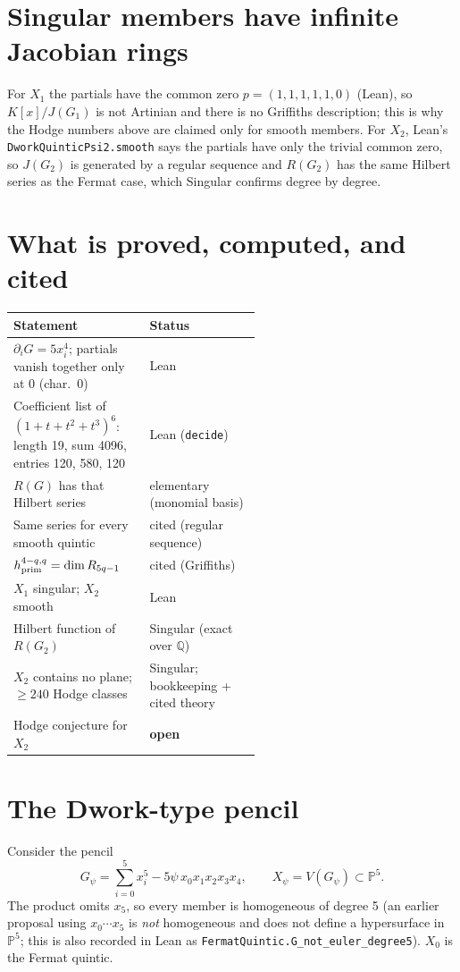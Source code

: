 \documentclass[11pt]{article}
\theoremstyle{definition}\newtheorem{definition}[theorem]{Definition}\newtheorem{remark}[theorem]{Remark}
\newcommand{\PP}{\mathbb{P}}\newcommand{\CC}{\mathbb{C}}\newcommand{\QQ}{\mathbb{Q}}
\begin{document}
\section{Singular members have infinite Jacobian rings}
For $X_1$ the partials have the common zero $p=(1,1,1,1,1,0)$ (Lean), so $K[x]/J(G_1)$ is not Artinian and
there is no Griffiths description; this is why the Hodge numbers above are claimed only for smooth members.
For $X_2$, Lean's \texttt{DworkQuinticPsi2.smooth} says the partials have only the trivial common zero, so
$J(G_2)$ is generated by a regular sequence and $R(G_2)$ has the same Hilbert series as the Fermat case,
which Singular confirms degree by degree.

\section{What is proved, computed, and cited}
\begin{center}\small
\begin{tabular}{p{0.55\linewidth}l}\toprule
Statement & Status\\\midrule
$\partial_iG=5x_i^4$; partials vanish together only at 0 (char.\ 0) & Lean\\
Coefficient list of $(1+t+t^2+t^3)^6$: length 19, sum 4096, entries 120, 580, 120 & Lean (\texttt{decide})\\
$R(G)$ has that Hilbert series & elementary (monomial basis)\\
Same series for every smooth quintic & cited (regular sequence)\\
$h^{4-q,q}_{\rm prim}=\dim R_{5q-1}$ & cited (Griffiths)\\
$X_1$ singular; $X_2$ smooth & Lean\\
Hilbert function of $R(G_2)$ & Singular (exact over $\QQ$)\\
$X_2$ contains no plane; $\ge 240$ Hodge classes & Singular; bookkeeping + cited theory\\
Hodge conjecture for $X_2$ & \textbf{open}\\\bottomrule
\end{tabular}\end{center}
\section{The Dwork-type pencil}\label{sec:dwork}
Consider the pencil
\[ G_\psi=\sum_{i=0}^5 x_i^5-5\psi\,x_0x_1x_2x_3x_4,\qquad X_\psi=V(G_\psi)\subset\PP^5 .\]
The product omits $x_5$, so every member is homogeneous of degree 5 (an earlier proposal using
$x_0\cdots x_5$ is \emph{not} homogeneous and does not define a hypersurface in $\PP^5$; this is also
recorded in Lean as \texttt{FermatQuintic.G\_not\_euler\_degree5}). $X_0$ is the Fermat quintic.
\end{document}
